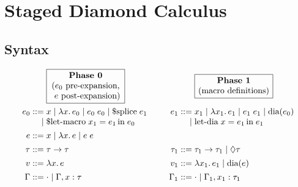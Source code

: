 \documentclass{article}
\begin{document}
\section{Staged Diamond Calculus}

\subsection{Syntax}

\vspace{2ex}
\noindent
\[\arraycolsep=1.4pt
\begin{array}{rlcrl}
                 & \boxed{\text{\parbox{8.5em}{\centering
                     \textbf{Phase 0}\\
                     ($e_0$ pre-expansion,\\
                     \hphantom{(}$e$ post-expansion)
                   }}}
                 & \hspace{2em} &
                 & \boxed{\text{\parbox{8.5em}{\centering
                     \textbf{Phase 1}\\
                     (macro definitions)
                   }}}
                \vspace{1ex}
                \\
         e_0 ::= & x
              \mid \lambda x.\,e_0
              \mid e_0\;e_0
              \mid \text{\$splice}\;e_1
                 & \hspace{2em} &
         e_1 ::= & x_1
              \mid \lambda x_1.\,e_1
              \mid e_1\;e_1
              \mid \text{dia}(e_0)
                \\
            \mid & \text{\$let-macro}\;x_1 = e_1\,\text{in}\;e_0
                 & \hspace{2em}
                 & 
            \mid & \text{let-dia}\;x = e_1\,\text{in}\;e_1
                \vspace{1ex}
                \\
           e ::= & x
              \mid \lambda x.\,e
              \mid e\;e
                \vspace{1ex}
                \\
        \tau ::= & \tau \to \tau
                 & \hspace{2em} &
      \tau_1 ::= & \tau_1 \to \tau_1
              \mid \Diamond \tau
                \vspace{1ex}
                \\
           v ::= & \lambda x.\,e
                 & \hspace{2em} &
         v_1 ::= & \lambda x_1.\,e_1
              \mid \text{dia}(e)
                \vspace{1ex}
                \\
      \Gamma ::= & \cdot
              \mid \Gamma, x : \tau
                 & \hspace{2em} &
    \Gamma_1 ::= & \cdot
              \mid \Gamma_1, x_1 : \tau_1
\end{array}
\]
\end{document}
